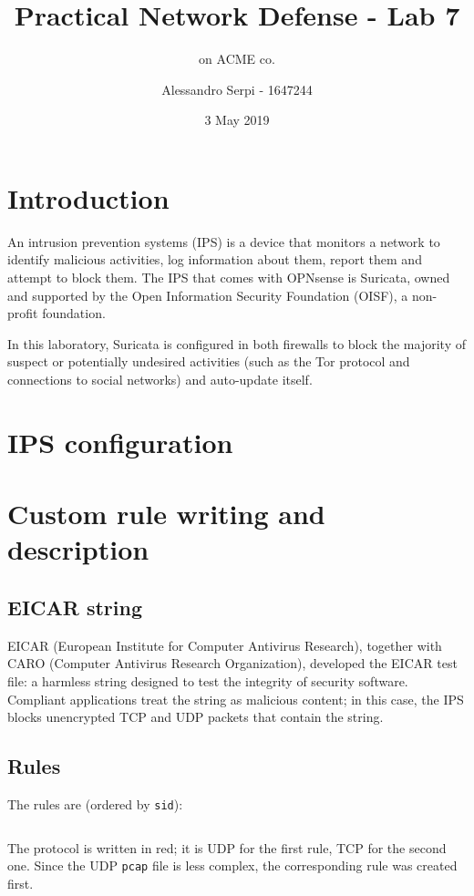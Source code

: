 \documentclass[draft]{homework}
\title{Practical Network Defense - Lab 7}
\subtitle{\suri on ACME co.}
\author{Alessandro Serpi - 1647244}
\date{3 May 2019}
\newcommand{\opn}{OPNsense\xspace}
\newcommand{\suri}{Suricata\xspace}
\begin{document}
    \maketitle
    \tableofcontents
    
    
    \pagebreak
    \section{Introduction}
    An intrusion prevention systems (IPS) is a device that monitors a network to identify malicious activities, log information about them, report them and attempt to block them.
    The IPS that comes with \opn is \suri, owned and supported by the Open Information Security Foundation (OISF), a non-profit foundation.
    
    In this laboratory, \suri is configured in both firewalls to block the majority of suspect or potentially undesired activities (such as the Tor protocol and connections to social networks) and auto-update itself.
    
    
    \section{IPS configuration}
    
    
    \section{Custom rule writing and description}
    \subsection{EICAR string}
    EICAR (European Institute for Computer Antivirus Research), together with CARO (Computer Antivirus Research Organization), developed the EICAR test file: a harmless string designed to test the integrity of security software.
    Compliant applications treat the string as malicious content; in this case, the IPS blocks unencrypted TCP and UDP packets that contain the string.
    
    \subsection{Rules}
    The rules are (ordered by \texttt{sid}):
    \inputminted[breaklines]{suricata.py:SuriLexer -x}{../pnd-lab7-es1/web/var/www/html/suricata/custom.rules}
    
    The protocol is written in red; it is UDP for the first rule, TCP for the second one.
    Since the UDP \texttt{pcap} file is less complex, the corresponding rule was created first.
    
\end{document}
